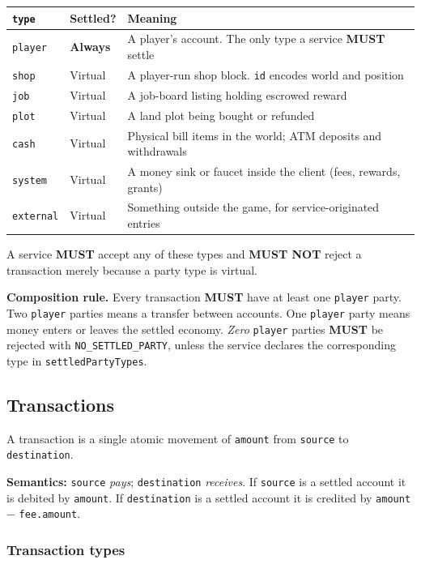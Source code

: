 \documentclass[11pt,a4paper]{article}
\newcommand{\code}[1]{\texttt{\small #1}}
\newcommand{\req}{\textbf{MUST}}
\newcommand{\keybox}[2]{%
  \par\vspace{0.5em}\noindent
  \colorbox{#1}{%
    \begin{minipage}{\dimexpr\linewidth-2\fboxsep\relax}
    \vspace{0.35em}\small #2\vspace{0.35em}
    \end{minipage}}%
  \par\vspace{0.5em}}
\newcommand{\note}[1]{\keybox{omceWash}{#1}}
\begin{document}
\begin{tabularx}{\linewidth}{L{2.4cm} L{2.4cm} X}
\toprule
\code{type} & \textbf{Settled?} & \textbf{Meaning}\\
\midrule
\code{player}   & \textbf{Always} & A player's account. The only type a service \req{} settle\\
\code{shop}     & Virtual & A player-run shop block. \code{id} encodes world and position\\
\code{job}      & Virtual & A job-board listing holding escrowed reward\\
\code{plot}     & Virtual & A land plot being bought or refunded\\
\code{cash}     & Virtual & Physical bill items in the world; ATM deposits and withdrawals\\
\code{system}   & Virtual & A money sink or faucet inside the client (fees, rewards, grants)\\
\code{external} & Virtual & Something outside the game, for service-originated entries\\
\bottomrule
\end{tabularx}

A service \req{} accept any of these types and \textbf{MUST NOT} reject a transaction merely
because a party type is virtual.

\note{\textbf{Composition rule.} Every transaction \req{} have at least one \code{player} party. Two
\code{player} parties means a transfer between accounts. One \code{player} party means money enters
or leaves the settled economy. \emph{Zero} \code{player} parties \req{} be rejected with
\code{NO\_SETTLED\_PARTY}, unless the service declares the corresponding type in
\code{settledPartyTypes}.}

\subsection{Transactions}
\label{sec:transactions}

A transaction is a single atomic movement of \code{amount} from \code{source} to
\code{destination}.

\textbf{Semantics:} \code{source} \emph{pays}; \code{destination} \emph{receives}. If \code{source}
is a settled account it is debited by \code{amount}. If \code{destination} is a settled account it
is credited by \code{amount} $-$ \code{fee.amount}.

\subsubsection*{Transaction types}
\end{document}
